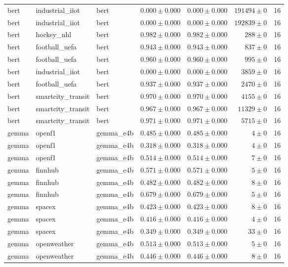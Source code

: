 \begin{table}[htbp]
\begin{tabular}{l l l r r r r}
bert & industrial\_iiot & bert & $0.000\pm0.000$ & $0.000\pm0.000$ & $191494\pm0$ & 16 \\
bert & industrial\_iiot & bert & $0.000\pm0.000$ & $0.000\pm0.000$ & $192839\pm0$ & 16 \\
bert & hockey\_nhl & bert & $0.982\pm0.000$ & $0.982\pm0.000$ & $288\pm0$ & 16 \\
bert & football\_uefa & bert & $0.943\pm0.000$ & $0.943\pm0.000$ & $837\pm0$ & 16 \\
bert & football\_uefa & bert & $0.960\pm0.000$ & $0.960\pm0.000$ & $995\pm0$ & 16 \\
bert & industrial\_iiot & bert & $0.000\pm0.000$ & $0.000\pm0.000$ & $3859\pm0$ & 16 \\
bert & football\_uefa & bert & $0.937\pm0.000$ & $0.937\pm0.000$ & $2470\pm0$ & 16 \\
bert & smartcity\_transit & bert & $0.970\pm0.000$ & $0.970\pm0.000$ & $4155\pm0$ & 16 \\
bert & smartcity\_transit & bert & $0.967\pm0.000$ & $0.967\pm0.000$ & $11329\pm0$ & 16 \\
bert & smartcity\_transit & bert & $0.971\pm0.000$ & $0.971\pm0.000$ & $5715\pm0$ & 16 \\
gemma & openf1 & gemma\_e4b & $0.485\pm0.000$ & $0.485\pm0.000$ & $4\pm0$ & 16 \\
gemma & openf1 & gemma\_e4b & $0.318\pm0.000$ & $0.318\pm0.000$ & $4\pm0$ & 16 \\
gemma & openf1 & gemma\_e4b & $0.514\pm0.000$ & $0.514\pm0.000$ & $7\pm0$ & 16 \\
gemma & finnhub & gemma\_e4b & $0.571\pm0.000$ & $0.571\pm0.000$ & $5\pm0$ & 16 \\
gemma & finnhub & gemma\_e4b & $0.482\pm0.000$ & $0.482\pm0.000$ & $8\pm0$ & 16 \\
gemma & finnhub & gemma\_e4b & $0.679\pm0.000$ & $0.679\pm0.000$ & $5\pm0$ & 16 \\
gemma & spacex & gemma\_e4b & $0.423\pm0.000$ & $0.423\pm0.000$ & $8\pm0$ & 16 \\
gemma & spacex & gemma\_e4b & $0.416\pm0.000$ & $0.416\pm0.000$ & $4\pm0$ & 16 \\
gemma & spacex & gemma\_e4b & $0.349\pm0.000$ & $0.349\pm0.000$ & $33\pm0$ & 16 \\
gemma & openweather & gemma\_e4b & $0.513\pm0.000$ & $0.513\pm0.000$ & $5\pm0$ & 16 \\
gemma & openweather & gemma\_e4b & $0.446\pm0.000$ & $0.446\pm0.000$ & $8\pm0$ & 16 \\

\end{tabular}
\end{table}
